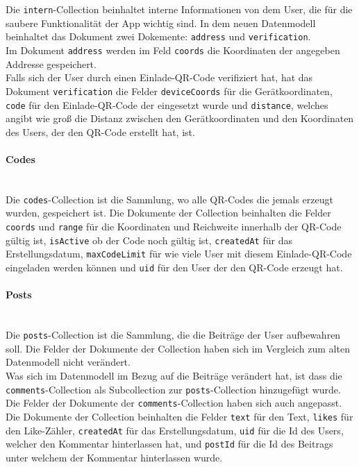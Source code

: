 \\\\
Die \texttt{intern}-Collection beinhaltet interne Informationen von dem User, die für die saubere Funktionalität der App wichtig sind. In dem neuen Datenmodell beinhaltet das Dokument zwei Dokemente: \texttt{address} und \texttt{verification}.
\\
Im Dokument \texttt{address} werden im Feld \texttt{coords} die Koordinaten der angegeben Addresse gespeichert.
\\
Falls sich der User durch einen Einlade-QR-Code verifiziert hat, hat das Dokument \texttt{verification} die Felder \texttt{deviceCoords} für die Gerätkoordinaten, \texttt{code} für den Einlade-QR-Code der eingesetzt wurde und \texttt{distance}, welches angibt wie groß die Distanz zwischen den Gerätkoordinaten und den Koordinaten des Users, der den QR-Code erstellt hat, ist.

\paragraph{Codes}\mbox{} \\
Die \texttt{codes}-Collection ist die Sammlung, wo alle QR-Codes die jemals erzeugt wurden, gespeichert ist. Die Dokumente der Collection beinhalten die Felder \texttt{coords} und \texttt{range} für die Koordinaten und Reichweite innerhalb der QR-Code gültig ist, \texttt{isActive} ob der Code noch gültig ist, \texttt{createdAt} für das Erstellungsdatum, \texttt{maxCodeLimit} für wie viele User mit diesem Einlade-QR-Code eingeladen werden können und \texttt{uid} für den User der den QR-Code erzeugt hat.

\paragraph{Posts}\mbox{} \\
Die \texttt{posts}-Collection ist die Sammlung, die die Beiträge der User aufbewahren soll. Die Felder der Dokumente der Collection haben sich im Vergleich zum alten Datenmodell nicht verändert.
\\
Was sich im Datenmodell im Bezug auf die Beiträge verändert hat, ist dass die \texttt{comments}-Collection als Subcollection zur \texttt{posts}-Collection hinzugefügt wurde. Die Felder der Dokumente der \texttt{comments}-Collection haben sich auch angepasst. Die Dokumente der Collection beinhalten die Felder \texttt{text} für den Text, \texttt{likes} für den Like-Zähler, \texttt{createdAt} für das Erstellungsdatum, \texttt{uid} für die Id des Users, welcher den Kommentar hinterlassen hat, und \texttt{postId} für die Id des Beitrags unter welchem der Kommentar hinterlassen wurde.

